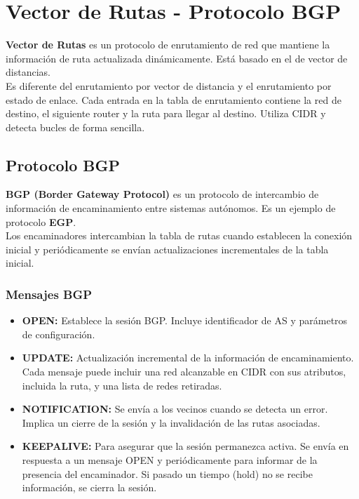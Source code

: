 \section{Vector de Rutas - Protocolo BGP}
\textbf{Vector de Rutas} es un protocolo de enrutamiento de red que mantiene la información de ruta actualizada dinámicamente. Está basado en el de vector de distancias.\\

Es diferente del enrutamiento por vector de distancia y el enrutamiento por estado de enlace. Cada entrada en la tabla de enrutamiento contiene la red de destino, el siguiente router y la ruta para llegar al destino. Utiliza CIDR y detecta bucles de forma sencilla.
\subsection{Protocolo BGP}
\textbf{BGP (Border Gateway Protocol)} es un protocolo de intercambio de información de encaminamiento entre sistemas autónomos. Es un ejemplo de protocolo \textbf{EGP}.\\

Los encaminadores intercambian la tabla de rutas cuando establecen la conexión inicial y periódicamente se envían actualizaciones incrementales de la tabla inicial.
\subsubsection{Mensajes BGP}
\begin{itemize}
    \item \textbf{OPEN: }Establece la sesión BGP. Incluye identificador de AS y parámetros de configuración.
    \item \textbf{UPDATE: }Actualización incremental de la información de encaminamiento. Cada mensaje puede incluir una red alcanzable en CIDR con sus atributos, incluida la ruta, y una lista de redes retiradas.
    \item \textbf{NOTIFICATION: }Se envía a los vecinos cuando se detecta un error. Implica un cierre de la sesión y la invalidación de las rutas asociadas.
    \item \textbf{KEEPALIVE: }Para asegurar que la sesión permanezca activa. Se envía en respuesta a un mensaje OPEN y periódicamente para informar de la
    presencia del encaminador. Si pasado un tiempo (hold) no se recibe información, se cierra la sesión.
\end{itemize}